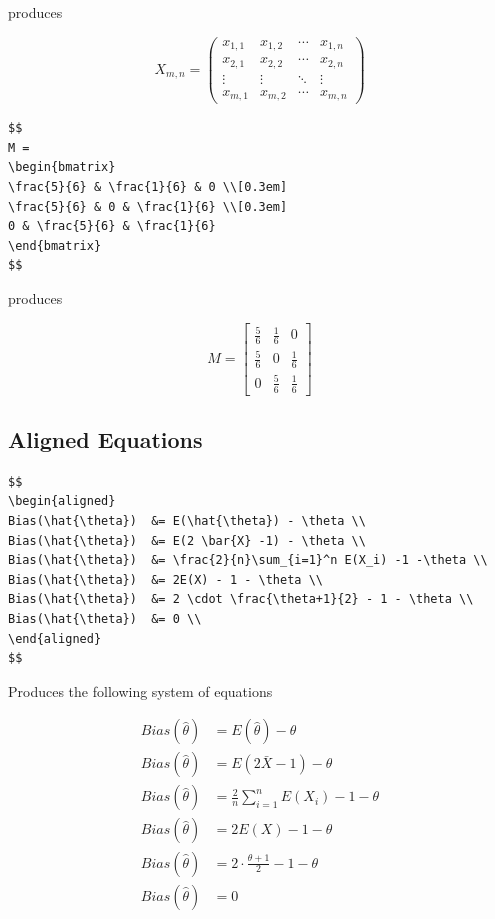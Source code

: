 \documentclass[
]{book}
\begin{document}
produces

\[
X_{m,n} = 
\begin{pmatrix}
  x_{1,1} & x_{1,2} & \cdots & x_{1,n} \\
  x_{2,1} & x_{2,2} & \cdots & x_{2,n} \\
  \vdots  & \vdots  & \ddots & \vdots  \\
  x_{m,1} & x_{m,2} & \cdots & x_{m,n} 
\end{pmatrix}
\]

\begin{verbatim}
$$
M = 
\begin{bmatrix}
\frac{5}{6} & \frac{1}{6} & 0 \\[0.3em]
\frac{5}{6} & 0 & \frac{1}{6} \\[0.3em]
0 & \frac{5}{6} & \frac{1}{6}
\end{bmatrix}
$$
\end{verbatim}

produces

\[
M = 
\begin{bmatrix}
\frac{5}{6} & \frac{1}{6} & 0 \\[0.3em]
\frac{5}{6} & 0 & \frac{1}{6} \\[0.3em]
0 & \frac{5}{6} & \frac{1}{6}
\end{bmatrix}
\]

\hypertarget{aligned-equations}{%
\subsection{Aligned Equations}\label{aligned-equations}}

\begin{verbatim}
$$
\begin{aligned}
Bias(\hat{\theta})  &= E(\hat{\theta}) - \theta \\
Bias(\hat{\theta})  &= E(2 \bar{X} -1) - \theta \\
Bias(\hat{\theta})  &= \frac{2}{n}\sum_{i=1}^n E(X_i) -1 -\theta \\
Bias(\hat{\theta})  &= 2E(X) - 1 - \theta \\
Bias(\hat{\theta})  &= 2 \cdot \frac{\theta+1}{2} - 1 - \theta \\
Bias(\hat{\theta})  &= 0 \\
\end{aligned}
$$
\end{verbatim}

Produces the following system of equations

\[
\begin{aligned}
Bias(\hat{\theta})  &= E(\hat{\theta}) - \theta \\
Bias(\hat{\theta})  &= E(2 \bar{X} -1) - \theta \\
Bias(\hat{\theta})  &= \frac{2}{n}\sum_{i=1}^n E(X_i) -1 -\theta \\
Bias(\hat{\theta})  &= 2E(X) - 1 - \theta \\
Bias(\hat{\theta})  &= 2 \cdot \frac{\theta+1}{2} - 1 - \theta \\
Bias(\hat{\theta})  &= 0 \\
\end{aligned}
\]
\end{document}

